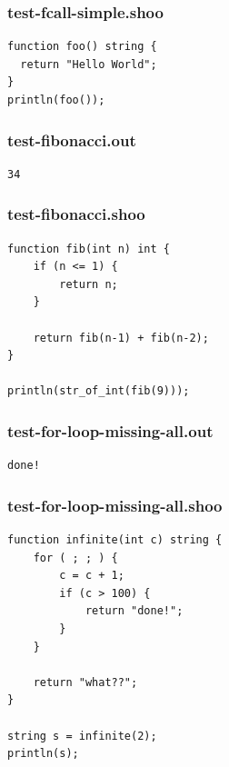 \documentclass[12pt]{article}
\begin{document}
\subsubsection{test-fcall-simple.shoo}
\begin{mdframed}[hidealllines=true,backgroundcolor=blue!10]
\begin{lstlisting}
function foo() string {
  return "Hello World";
}
println(foo());\end{lstlisting}
\end{mdframed}
\subsubsection{test-fibonacci.out}
\begin{mdframed}[hidealllines=true,backgroundcolor=green!10]
\begin{lstlisting}
34
\end{lstlisting}
\end{mdframed}
\subsubsection{test-fibonacci.shoo}
\begin{mdframed}[hidealllines=true,backgroundcolor=blue!10]
\begin{lstlisting}
function fib(int n) int {
    if (n <= 1) {
        return n;
    }

    return fib(n-1) + fib(n-2);
}

println(str_of_int(fib(9)));
\end{lstlisting}
\end{mdframed}
\subsubsection{test-for-loop-missing-all.out}
\begin{mdframed}[hidealllines=true,backgroundcolor=green!10]
\begin{lstlisting}
done!
\end{lstlisting}
\end{mdframed}
\subsubsection{test-for-loop-missing-all.shoo}
\begin{mdframed}[hidealllines=true,backgroundcolor=blue!10]
\begin{lstlisting}
function infinite(int c) string {
    for ( ; ; ) {
        c = c + 1;
        if (c > 100) {
            return "done!";
        }
    }
    
    return "what??";
}

string s = infinite(2);
println(s);
\end{lstlisting}
\end{mdframed}
\end{document}
